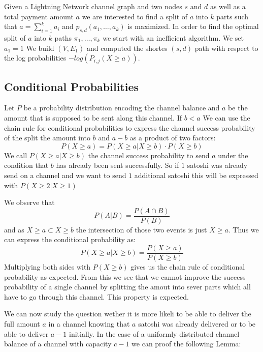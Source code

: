 \documentclass[10pt,twocolumn]{article}
\begin{document}
Given a Lightning Network channel graph and two nodes $s$ and $d$ as well as a total payment amount $a$ we are interested to find a split of $a$ into $k$ parts such that $a=\sum_{i=1}^ka_i$ and $p_{s,d}(a_1,\dots,a_k)$ is maximized.
In order to find the optimal split of $a$ into $k$ paths $\pi_1,\dots,\pi_k$ we start with an inefficient algorithm.
We set $a_1 = 1$
We build $(V,E_1)$ and computed the shortes $(s,d)$ path with respect to the log probabilities $-log(P_{i,j}(X \geq a))$.

\subsection{Conditional Probabilities}
Let $P$ be a probability distribution encoding the channel balance and $a$ be the amount that is supposed to be sent along this channel.
If $b<a$ We can use the chain rule for conditional probabilities to express the channel success probability of the split the amount into $b$ and $a-b$ as a product of two factors:
\[
P(X \geq a) = P(X \geq a | X \geq b)\cdot P(X \geq b)
\]
We call $P(X\geq a | X \geq b)$ the channel success probability to send $a$ under the condition that $b$ has already been sent successfully.
So if $1$ satoshi was already send on a channel and we want to send $1$ additional satoshi this will be expressed with $P(X\geq 2 | X \geq 1)$

We observe that
\[
P(A|B)=\frac{P(A\cap B)}{P(B)}
\]
and as $X \geq a \subset X \geq b$ the intersection of those two events is just $X\geq a$.
Thus we can express the conditional probability as:
\[
P(X\geq a| X\geq b) = \frac{P(X \geq a)}{P(X\geq b)}
\]
Multiplying both sides with $P(X\geq b)$ gives us the chain rule of conditional probability as expected.
From this we see that we cannot improve the success probability of a single channel by splitting the amout into sever parts which all have to go through this channel.
This property is expected.

We can now study the question wether it is more likeli to be able to deliver the full amount $a$ in a channel knowing that $a$ satoshi was already delivered or to be able to deliver $a-1$ initially.
In the case of a uniformly distributed channel balance of a channel with capacity $c-1$ we can proof the following Lemma:
\end{document}
